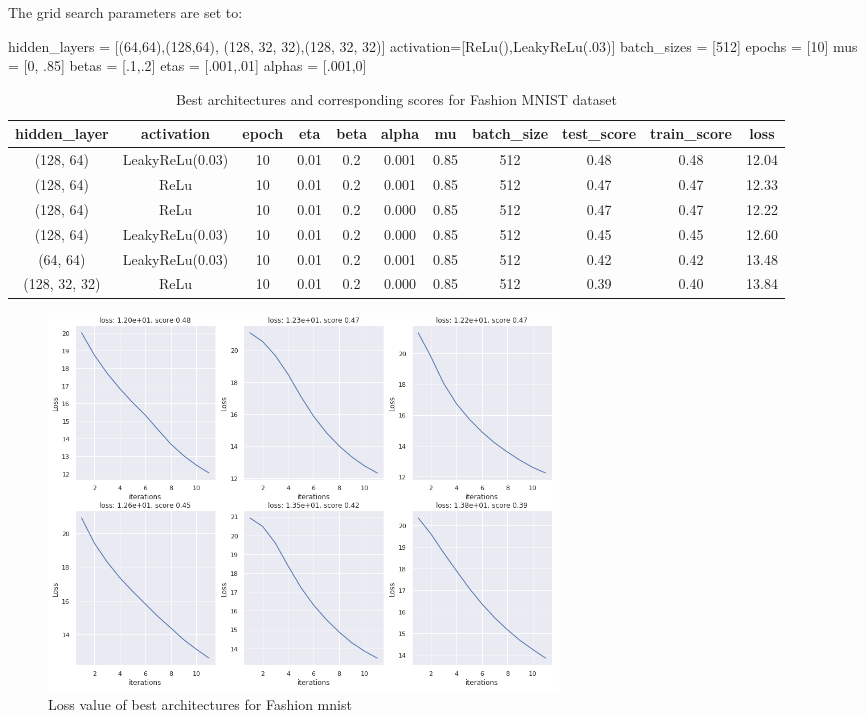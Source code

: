 \documentclass[10pt]{SelfArx} %
\begin{document}
	The grid search parameters are set to:
	\begin{python}
hidden_layers = [(64,64),(128,64),
(128, 32, 32),(128, 32, 32)]
activation=[ReLu(),LeakyReLu(.03)]
batch_sizes = [512]
epochs = [10]
mus = [0, .85]
betas = [.1,.2]
etas = [.001,.01]
alphas = [.001,0]
	\end{python}
	\begin{table}[]
		\begin{tabular*}{1\textwidth}{@{\extracolsep{\fill} }ccccccccccc@{}}
			\toprule
			hidden\_layer & activation & epoch & eta & beta & alpha & mu & batch\_size & test\_score & train\_score & loss \\ \midrule
			(128, 64) & LeakyReLu(0.03) & 10 & 0.01 & 0.2 & 0.001 & 0.85 & 512 & 0.48 & 0.48 & 12.04 \\
			(128, 64) & ReLu & 10 & 0.01 & 0.2 & 0.001 & 0.85 & 512 & 0.47 & 0.47 & 12.33 \\
			(128, 64) & ReLu & 10 & 0.01 & 0.2 & 0.000 & 0.85 & 512 & 0.47 & 0.47 & 12.22 \\
			(128, 64) & LeakyReLu(0.03) & 10 & 0.01 & 0.2 & 0.000 & 0.85 & 512 & 0.45 & 0.45 & 12.60 \\
			(64, 64) & LeakyReLu(0.03) & 10 & 0.01 & 0.2 & 0.001 & 0.85 & 512 & 0.42 & 0.42 & 13.48 \\
			(128, 32, 32) & ReLu & 10 & 0.01 & 0.2 & 0.000 & 0.85 & 512 & 0.39 & 0.40 & 13.84 \\ \bottomrule
		\end{tabular*}
		\caption{Best architectures and corresponding scores for Fashion MNIST dataset}
		\label{tfashion}
	\end{table}
	\begin{figure}\centering
		\includegraphics[width=1.79\columnwidth, height=10cm]{img/fashion-plots1}
		\caption{Loss value of best architectures for Fashion mnist}
		\label{ffashion}
	\end{figure}
\end{document}
